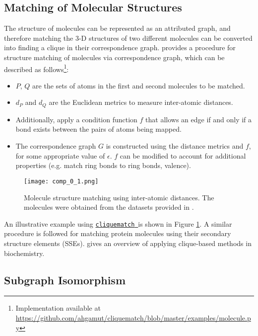 \documentclass[12pt]{article}
\newcommand{\clqm}{\href{https://github.com/ahgamut/cliquematch}{\texttt{cliquematch}~}}
\begin{document}
\subsection{Matching of Molecular Structures}%
\label{sub:protein}

The structure of molecules can be represented as an attributed graph, and therefore
matching the 3-D structures of two different molecules can be converted into finding a
clique in their correspondence graph. \citep{gardiner1997} provides a procedure for
structure matching of molecules via correspondence graph, which can be described as
follows\footnote{Implementation available at \url{https://github.com/ahgamut/cliquematch/blob/master/examples/molecule.py}}:

\begin{itemize}
	\item $P$, $Q$ are the sets of atoms in the first and
	      second molecules to be matched.
	\item $d_P$ and $d_Q$ are the Euclidean metrics to measure
	      inter-atomic distances.
	\item Additionally, apply a condition function $f$ that allows an edge if
	      and only if a bond exists between the pairs of atoms being mapped.
	\item The correspondence graph $G$ is constructed using the distance metrics
	      and $f$, for some appropriate value of $\epsilon$.
	      $f$ can be modified to account for additional properties (e.g. match
	      ring bonds to ring bonds, valence).
\end{itemize}

\begin{figure}[phtb]
	\centering
	\texttt{[image: comp\_0\_1.png]}
	\caption{Molecule structure matching using inter-atomic distances. The molecules were obtained
		from the datasets provided in \citep{sutherland2003}.}
	\label{fig:molecule}
\end{figure}

An illustrative example using \clqm is shown in Figure \ref{fig:molecule}. A similar
procedure is followed for matching protein molecules using their secondary structure
elements (SSEs). \citep{butenko2006} gives an overview of applying clique-based
methods in biochemistry.

\subsection{Subgraph Isomorphism}%
\label{sub:isograph}
\end{document}
